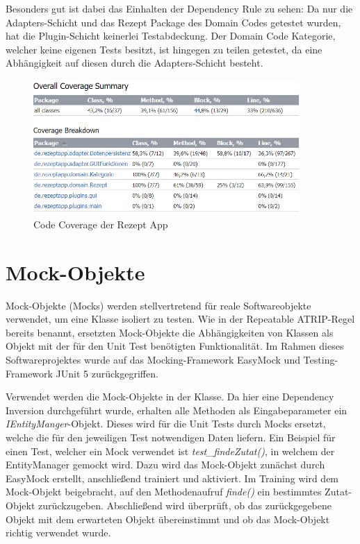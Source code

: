 Besonders gut ist dabei das Einhalten der Dependency Rule zu sehen: Da nur die Adapters-Schicht und das Rezept Package des Domain Codes getestet wurden, hat die Plugin-Schicht keinerlei Testabdeckung. Der Domain Code Kategorie, welcher keine eigenen Tests besitzt, ist hingegen zu teilen getestet, da eine Abhängigkeit auf diesen durch die Adapters-Schicht besteht.

\begin{figure}[ht]
	\centering
	\includegraphics[width=0.90\textwidth]{Bilder/CodeCoverage.png} 
	\caption{Code Coverage der Rezept App}
	\label{fig:CodeCoverageBild}
\end{figure}

\section{Mock-Objekte}
\label{Mocks}

Mock-Objekte (Mocks) werden stellvertretend für reale Softwareobjekte verwendet, um eine Klasse isoliert zu testen. Wie in der Repeatable ATRIP-Regel bereits benannt, ersetzten Mock-Objekte die Abhängigkeiten von Klassen als Objekt mit der für den Unit Test benötigten Funktionalität. Im Rahmen dieses Softwareprojektes wurde auf das Mocking-Framework EasyMock und Testing-Framework JUnit 5 zurückgegriffen.

Verwendet werden die Mock-Objekte in der \href{https://github.com/MichaelaHaag/RezeptApp/blob/main/3-Domain-Code/src/test/java/de/rezeptapp/domain/Rezept/RezeptRepositoryTest.java}{} Klasse. Da hier eine Dependency Inversion durchgeführt wurde, erhalten alle Methoden als Eingabeparameter ein \emph{IEntityManger}-Objekt. Dieses wird für die Unit Tests durch Mocks ersetzt, welche die für den jeweiligen Test notwendigen Daten liefern. Ein Beispiel für einen Test, welcher ein Mock verwendet ist \emph{test\_findeZutat()}, in welchem der EntityManager gemockt wird. Dazu wird das Mock-Objekt zunächst durch EasyMock erstellt, anschließend trainiert und aktiviert. Im Training wird dem Mock-Objekt beigebracht, auf den Methodenaufruf \emph{finde()} ein bestimmtes Zutat-Objekt zurückzugeben. Abschließend wird überprüft, ob das zurückgegebene Objekt mit dem erwarteten Objekt übereinstimmt und ob das Mock-Objekt richtig verwendet wurde. 
